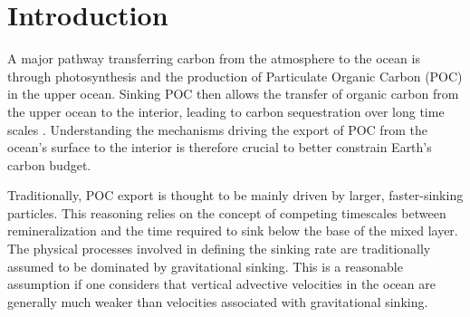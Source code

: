 \documentclass[draft,linenumbers]{agujournal2018}
\begin{document}

\section{Introduction}

A major pathway transferring carbon from the atmosphere to the ocean is through photosynthesis and the production of Particulate Organic Carbon (POC) in the upper ocean. Sinking POC then allows the transfer of organic carbon from the upper ocean to the interior, leading to carbon sequestration over long time scales \citep{Falkowski_1998}. Understanding the mechanisms driving the export of POC from the ocean's surface to the interior is therefore crucial to better constrain Earth's carbon budget.  

Traditionally, POC export is thought to be mainly driven by larger, faster-sinking particles. This reasoning relies on the concept of competing timescales between remineralization and the time required to sink below the base of the mixed layer. The physical processes involved in defining the sinking rate are traditionally assumed to be dominated by gravitational sinking. This is a reasonable assumption if one considers that vertical advective velocities in the ocean are generally much weaker than velocities associated with gravitational sinking. 
\end{document}
